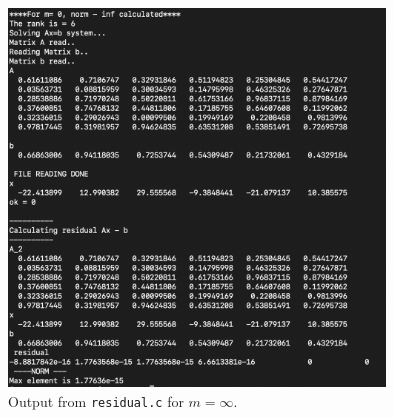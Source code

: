 \documentclass[12pt]{article}
\begin{document}
\begin{figure}
    
    \includegraphics[width=10cm]{norminf.png}
    \centering
    \caption{Output from \lstinline{residual.c} for $m= \infty$.}

\end{figure}
\end{document}
